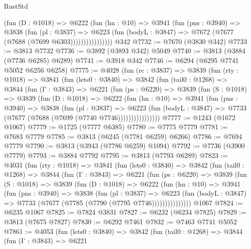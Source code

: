\begin{lexlean}{RustStd}
\begin{coremodule}
                    (fun (D : @1018) =>
                    @6222
                      (fun (hn : @10) =>
                      @3941
                        (fun (pns : @3940) =>
                        @3838
                          (fun (pl : @3837) =>
                          @6223
                            (fun (bodyL : @3847) => @7672 (@7677 (@7688 (@7699 @6303))))))))))))))))
    @342
@7732 := @7670 (@3830 @342)
@7733 := @3813 @7732
@7736 := @3892 (@3893 @342) @5049
@7740 := @3813 (@3884 (@7736 @6285) @6289)
@7741 := @3918 @342
@7746 := @6294 (@6295 @7741 @5052 @6256 @6258)
@7775 := @4028
    (fun (rc : @3837) =>
    @3839
      (fun (rty : @1018) =>
      @3841
        (fun (lets0 : @3840) =>
        @3842
          (fun (tail0 : @1268) =>
          @3844
            (fun (Γ : @3843) =>
            @6221
              (fun (ps : @6220) =>
              @3839
                (fun (S : @1018) =>
                @3839
                  (fun (D : @1018) =>
                  @6222
                    (fun (hn : @10) =>
                    @3941
                      (fun (pns : @3940) =>
                      @3838
                        (fun (pl : @3837) =>
                        @6223
                          (fun (bodyL : @3847) =>
                          @7733 (@7677 (@7688 (@7699 (@7740 @7746))))))))))))))))
@7777 := @1243 (@1672 @1067)
@7779 := @1725 (@7777 @6385)
@7780 := @7775 @7779
@7781 := @7683 @7779
@7785 := @3813 (@6245 (@7781 @6259) @6266)
@7786 := @7694 @7779
@7790 := @3813 (@3943 (@7786 @6259) @1094)
@7792 := @7736 (@3900 @7779)
@7793 := @3884 @7792
@7795 := @3813 (@7793 @6289)
@7823 := @4031
    (fun (rty : @1018) =>
    @3841
      (fun (lets0 : @3840) =>
      @3842
        (fun (tail0 : @1268) =>
        @3844
          (fun (Γ : @3843) =>
          @6221
            (fun (ps : @6220) =>
            @3839
              (fun (S : @1018) =>
              @3839
                (fun (D : @1018) =>
                @6222
                  (fun (hn : @10) =>
                  @3941
                    (fun (pns : @3940) =>
                    @3838
                      (fun (pl : @3837) =>
                      @6223
                        (fun (bodyL : @3847) =>
                        @7733 (@7677 (@7785 (@7790 (@7795 @7746)))))))))))))))
    @1067
@7824 := @6235 @1067
@7825 := @7824 @3831
@7827 := @6232 (@6234 @7825)
@7829 := @3813 (@7675 @7827)
@7830 := @6292 @7461
@7832 := @7463 @7741 @5052
@7861 := @4053
    (fun (lets0 : @3840) =>
    @3842
      (fun (tail0 : @1268) =>
      @3844
        (fun (Γ : @3843) =>
        @6221

\end{coremodule}
\end{lexlean}

